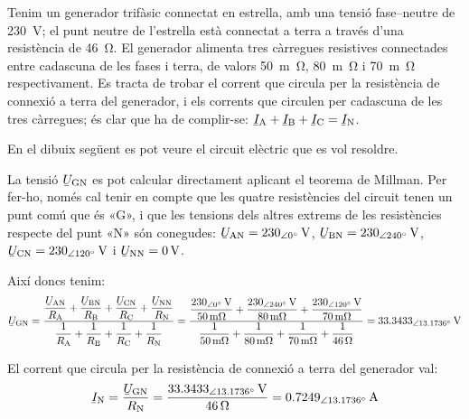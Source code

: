 \begin{exemple}
    Tenim un generador trifàsic connectat en estrella, amb una tensió fase--neutre de \SI{230}{V}; el punt neutre de l'estrella està connectat a terra a través d'una resistència de \SI{46}{\ohm}. El generador alimenta tres càrregues resistives connectades entre cadascuna de les fases i terra, de valors \SI{50}{m\ohm}, \SI{80}{m\ohm} i \SI{70}{m\ohm} respectivament. Es tracta de trobar el corrent que circula per la resistència de connexió a terra del generador, i els corrents que circulen per cadascuna de les tres càrregues; és clar que ha de complir-se: $\cmplx{I}\ped{A} + \cmplx{I}\ped{B} + \cmplx{I}\ped{C} = \cmplx{I}\ped{N}$.

    En el dibuix següent es pot veure el circuit elèctric que es vol resoldre.

    \begin{center}
        
    \end{center}

    La tensió $\cmplx{U}\ped{GN}$ es pot calcular directament aplicant el teorema de Millman. Per fer-ho, només cal tenir en compte que les quatre resistències del circuit tenen un punt comú que és «G», i que les tensions dels altres extrems de les resistències respecte del punt «N» són conegudes: $\cmplx{U}\ped{AN}=\SIpd{230}{0}{V}$, $\cmplx{U}\ped{BN}=\SIpd{230}{240}{V}$, $\cmplx{U}\ped{CN}=\SIpd{230}{120}{V}$ i  $\cmplx{U}\ped{NN}=\SI{0}{V}$.

    Així doncs tenim:
    \[
    \cmplx{U}\ped{GN} = \frac{ \dfrac{\cmplx{U}\ped{AN}}{R\ped{A}} + \dfrac{\cmplx{U}\ped{BN}}{R\ped{B}} + \dfrac{\cmplx{U}\ped{CN}}{R\ped{C}} + \dfrac{\cmplx{U}\ped{NN}}{R\ped{N}}} { \dfrac{1}{R\ped{A}} + \dfrac{1}{R\ped{B}} + \dfrac{1}{R\ped{C}} + \dfrac{1}{R\ped{N}} } =
    \frac{\dfrac{\SIpd{230}{0}{V}}{\SI{50}{m\ohm}}+\dfrac{\SIpd{230}{240}{V}}{\SI{80}{m\ohm}}+
    \dfrac{\SIpd{230}{120}{V}}{\SI{70}{m\ohm}}}{\dfrac{1}{\SI{50}{m\ohm}}+\dfrac{1}{\SI{80}{m\ohm}}+
    \dfrac{1}{\SI{70}{m\ohm}}+\dfrac{1}{\SI{46}{\ohm}}} =
    \SIpd{33,3433}{13,1736}{V}
    \]

    El corrent  que circula per la resistència de connexió a terra del generador val:
    \[
    \cmplx{I}\ped{N} = \frac{\cmplx{U}\ped{GN}}{R\ped{N}} = \frac{\SIpd{33,3433}{13,1736}{V}}{\SI{46}{\ohm}}
    = \SIpd{0,7249}{13,1736}{A}
    \]


\end{exemple}
